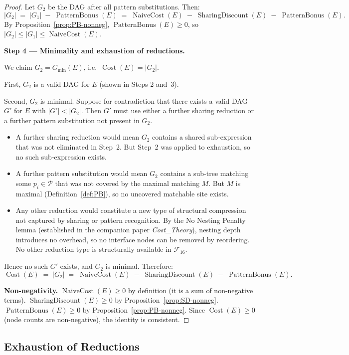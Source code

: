 \documentclass[12pt,a4paper]{article}
\theoremstyle{definition}
\newcommand{\Cost}{\operatorname{Cost}}
\newcommand{\NC}{\operatorname{NaiveCost}}
\newcommand{\SD}{\operatorname{SharingDiscount}}
\newcommand{\PB}{\operatorname{PatternBonus}}
\newcommand{\Gmin}{G_{\min}(E)}
\begin{document}
\begin{proof}
Let $G_2$ be the DAG after all pattern substitutions.  Then:
\[
  |G_2| \;=\; |G_1| \;-\; \PB(E) \;=\; \NC(E) \;-\; \SD(E) \;-\; \PB(E).
\]
By Proposition~\ref{prop:PB-nonneg}, $\PB(E) \geq 0$, so
$|G_2| \leq |G_1| \leq \NC(E)$.

\textbf{Step 4 --- Minimality and exhaustion of reductions.}

We claim $G_2 = \Gmin$, i.e.\ $\Cost(E) = |G_2|$.

First, $G_2$ is a valid DAG for $E$ (shown in Steps 2 and~3).

Second, $G_2$ is minimal.  Suppose for contradiction that there exists a valid
DAG $G'$ for $E$ with $|G'| < |G_2|$.  Then $G'$ must use either a further
sharing reduction or a further pattern substitution not present in $G_2$.
\begin{itemize}
  \item A further sharing reduction would mean $G_2$ contains a shared
        sub-expression that was not eliminated in Step~2.  But Step~2 was
        applied to exhaustion, so no such sub-expression exists.
  \item A further pattern substitution would mean $G_2$ contains a sub-tree
        matching some $p_i \in \mathcal{P}$ that was not covered by the
        maximal matching $M$.  But $M$ is maximal (Definition~\ref{def:PB}),
        so no uncovered matchable site exists.
  \item Any other reduction would constitute a new type of structural
        compression not captured by sharing or pattern recognition.  By the
        No Nesting Penalty lemma (established in the companion paper
        \emph{Cost\_Theory}), nesting depth introduces no overhead, so no
        interface nodes can be removed by reordering.  No other reduction type
        is structurally available in $\mathcal{F}_{16}$.
\end{itemize}
Hence no such $G'$ exists, and $G_2$ is minimal.  Therefore:
\[
  \Cost(E) \;=\; |G_2| \;=\; \NC(E) \;-\; \SD(E) \;-\; \PB(E).
\]

\textbf{Non-negativity.}
$\NC(E) \geq 0$ by definition (it is a sum of non-negative terms).
$\SD(E) \geq 0$ by Proposition~\ref{prop:SD-nonneg}.
$\PB(E) \geq 0$ by Proposition~\ref{prop:PB-nonneg}.
Since $\Cost(E) \geq 0$ (node counts are non-negative), the identity is
consistent.
\end{proof}

\subsection{Exhaustion of Reductions}
\end{document}
